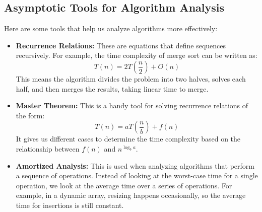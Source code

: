 \documentclass[12pt]{book} %
\begin{document}

\subsection{Asymptotic Tools for Algorithm Analysis}
Here are some tools that help us analyze algorithms more effectively:
\begin{itemize}
    \item \textbf{Recurrence Relations:} These are equations that define sequences recursively. For example, the time complexity of merge sort can be written as:
    \[
    T(n) = 2T\left(\frac{n}{2}\right) + O(n)
    \]
    This means the algorithm divides the problem into two halves, solves each half, and then merges the results, taking linear time to merge.

    \item \textbf{Master Theorem:} This is a handy tool for solving recurrence relations of the form:
    \[
    T(n) = aT\left(\frac{n}{b}\right) + f(n)
    \]
    It gives us different cases to determine the time complexity based on the relationship between $f(n)$ and $n^{\log_b a}$.

    \item \textbf{Amortized Analysis:} This is used when analyzing algorithms that perform a sequence of operations. Instead of looking at the worst-case time for a single operation, we look at the average time over a series of operations. For example, in a dynamic array, resizing happens occasionally, so the average time for insertions is still constant.
\end{itemize}
\end{document}
